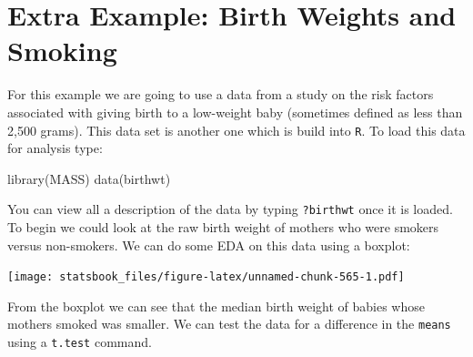 \documentclass[
]{book}
\newenvironment{Shaded}{\begin{snugshade}}{\end{snugshade}}
\newcommand{\AttributeTok}[1]{\textcolor[rgb]{0.77,0.63,0.00}{#1}}
\newcommand{\FunctionTok}[1]{\textcolor[rgb]{0.00,0.00,0.00}{#1}}
\newcommand{\NormalTok}[1]{#1}
\newcommand{\SpecialCharTok}[1]{\textcolor[rgb]{0.00,0.00,0.00}{#1}}
\newcommand{\StringTok}[1]{\textcolor[rgb]{0.31,0.60,0.02}{#1}}
\theoremstyle{definition}
\theoremstyle{definition}
\theoremstyle{definition}
\theoremstyle{definition}
\theoremstyle{remark}
\begin{document}
\hypertarget{extra-example-birth-weights-and-smoking}{%
\section{Extra Example: Birth Weights and Smoking}\label{extra-example-birth-weights-and-smoking}}

For this example we are going to use a data from a study on the risk factors associated with giving birth to a low-weight baby (sometimes defined as less than 2,500 grams). This data set is another one which is build into \texttt{R}. To load this data for analysis type:

\begin{Shaded}
\begin{Highlighting}[]
\FunctionTok{library}\NormalTok{(MASS)}
\FunctionTok{data}\NormalTok{(birthwt)}
\end{Highlighting}
\end{Shaded}

You can view all a description of the data by typing \texttt{?birthwt} once it is loaded. To begin we could look at the raw birth weight of mothers who were smokers versus non-smokers. We can do some EDA on this data using a boxplot:

\begin{Shaded}
\end{Shaded}

\texttt{[image: statsbook\_files/figure-latex/unnamed-chunk-565-1.pdf]}

From the boxplot we can see that the median birth weight of babies whose mothers smoked was smaller. We can test the data for a difference in the \texttt{means} using a \texttt{t.test} command.

\begin{Shaded}
\end{Shaded}
\end{document}
